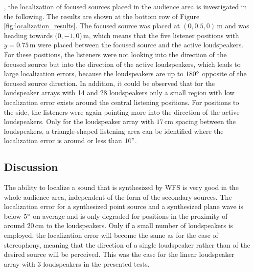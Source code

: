 , the localization of focused
sources placed in the audience area is investigated in the following.
The results are shown
at the bottom row of Figure\,\ref{fig:localization_results}. The focused source
was placed at $(0,0.5,0)$\,m and was heading towards $(0,-1,0$)\,m, which means that
the five listener positions with $y=0.75$\,m were placed between the focused
source and the active loudspeakers. For these positions, the listeners were not
looking into the direction of the focused source but into the direction of the
active loudspeakers, which leads to large localization errors, because the
loudspeakers are up to $180^\circ$ opposite of the focused source direction.
In addition, it could be observed that for the loudspeaker arrays with 14 and 28
loudspeakers only a small region with low localization error exists around the
central listening positions. For positions to the side, the
listeners were again pointing more into the direction of the active loudspeakers.
Only for the loudspeaker array with $17$\,cm spacing
between the loudspeakers, a triangle-shaped listening area can be identified where the
localization error is around or less than $10^\circ$.


\subsection{Discussion}
\label{sec:localization_discussion}
%
The ability to localize a sound that is synthesized by \ac{WFS} is very good in
the whole audience area, independent of the form of the secondary sources. The
localization error for a synthesized point source and a synthesized plane wave
is below $5^\circ$ on average and is only degraded for positions in the
proximity of around $20$\,cm to the loudspeakers. Only if a small number of loudspeakers
is employed, the localization error will become the same as for the case
of stereophony, meaning that the direction of a single loudspeaker rather than of
the desired source will be perceived. This was the case for the linear
loudspeaker array with 3 loudspeakers in the presented tests.

